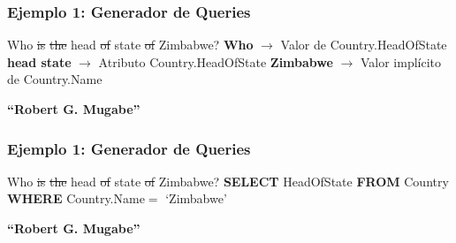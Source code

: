 \begin{frame}[t]
\frametitle{Ejemplo 1: Generador de Queries}
\Large{{\color{blue}Who} \st{is} \st{the} {\color{blue}head} \st{of} {\color{blue}state} \st{of} {\color{purple}Zimbabwe}? 
\bigskip
\newline
\textbf{{\color{blue}Who}} $\rightarrow$ Valor de Country.HeadOfState \newline
\textbf{{\color{blue}head state}} $\rightarrow$ Atributo Country.HeadOfState \newline
\textbf{{\color{purple}Zimbabwe}} $\rightarrow$ Valor implícito de Country.Name \newline
}

\bigskip

{\color{white}\textbf{``Robert G. Mugabe''}}

\end{frame}

\begin{frame}[t]
\frametitle{Ejemplo 1: Generador de Queries}
\Large{{\color{blue}Who} \st{is} \st{the} {\color{blue}head} \st{of} {\color{blue}state} \st{of} {\color{purple}Zimbabwe}? 
\bigskip
\newline
\textbf{{\color{purple}SELECT}} HeadOfState \newline
{\color{purple}\textbf{FROM}} Country \newline
{\color{purple}\textbf{WHERE}} Country.Name$=$ {\color{green}`Zimbabwe'}
}

\bigskip

\textbf{``Robert G. Mugabe''}

\end{frame}



